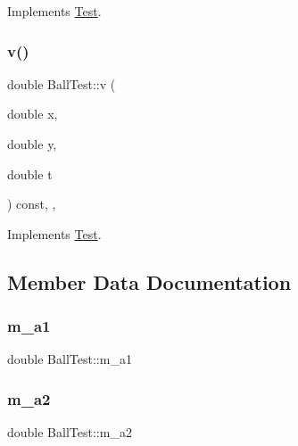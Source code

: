 Implements \hyperlink{classTest_a91fdf3bb74a1fc0e7e95895acb94085a}{Test}.

\mbox{\label{classBallTest_a37f7bbe3960912d5284acf91eea382b6}} 
\subsubsection{\texorpdfstring{v()}{v()}}
{\footnotesize\ttfamily double Ball\+Test\+::v (\begin{DoxyParamCaption}\item[{double}]{x,  }\item[{double}]{y,  }\item[{double}]{t }\end{DoxyParamCaption}) const\hspace{0.3cm}{\ttfamily [inline]}, {\ttfamily [override]}, {\ttfamily [virtual]}}



Implements \hyperlink{classTest_a9a2696e671a1903b0dd3c84178e3f73f}{Test}.



\subsection{Member Data Documentation}
\mbox{\label{classBallTest_a1504b9ceaf7d2e81d5aefdb01e6d399b}} 
\subsubsection{\texorpdfstring{m\+\_\+a1}{m\_a1}}
{\footnotesize\ttfamily double Ball\+Test\+::m\+\_\+a1\hspace{0.3cm}{\ttfamily [private]}}

\mbox{\label{classBallTest_a67d356662b8632c9c046e1ddbc25f4b1}} 
\subsubsection{\texorpdfstring{m\+\_\+a2}{m\_a2}}
{\footnotesize\ttfamily double Ball\+Test\+::m\+\_\+a2\hspace{0.3cm}{\ttfamily [private]}}

